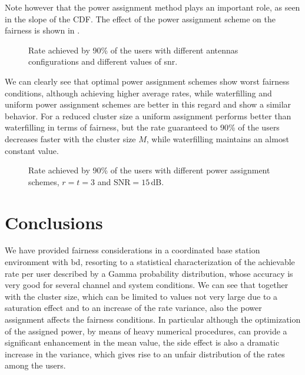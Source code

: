 Note however that the power assignment method plays an important role, as seen in the slope of the CDF. The effect of the power assignment scheme on the fairness is shown in .
\begin{figure}[t]
\begin{center}
\begin{small}
\end{small}
\end{center}
\vspace*{-2.2mm}\caption{Rate achieved by 90\% of the users with different antennas configurations and different values of \gls{snr}.}\label{Fairness90}
\end{figure}
We can clearly see that optimal power assignment schemes show worst fairness conditions, although achieving higher average rates, while waterfilling and uniform power assignment schemes are better in this regard and show a similar behavior. For a reduced cluster size a uniform assignment performs better than waterfilling in terms of fairness, but the rate guaranteed to 90\% of the users decreases faster with the cluster size $M$, while waterfilling maintains an almost constant value.

\begin{figure}[t]
\begin{center}
\begin{small}
\end{small}
\end{center}
\vspace*{-2.2mm}\caption{Rate achieved by 90\% of the users with different power assignment schemes, $r=t=3$ and SNR$=15$\,dB.}\label{Fairness90power}
\end{figure}

\section{Conclusions}
We have provided fairness considerations in a coordinated base station environment with \gls{bd}, resorting to a statistical characterization of the achievable rate per user described by a Gamma probability distribution, whose accuracy is very good for several channel and system conditions. We can see that together with the cluster size, which can be limited to values not very large due to a saturation effect and to an increase of the rate variance, also the power assignment affects the fairness conditions. In particular although the optimization of the assigned power, by means of heavy numerical procedures, can provide a significant enhancement in the mean value, the side effect is also a dramatic increase in the variance, which gives rise to an unfair distribution of the rates among the users.
